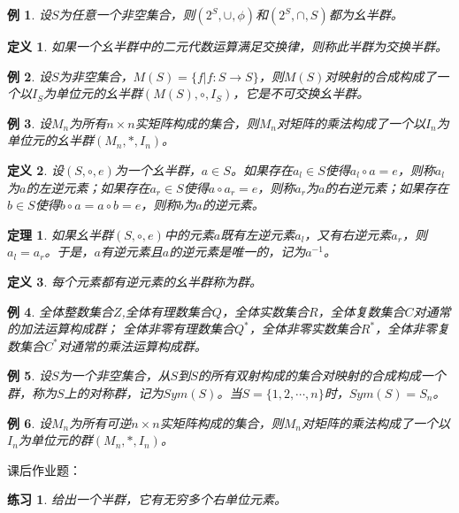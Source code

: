 \documentclass{article}
\newtheorem{Def}{定义}
\newtheorem{Thm}{定理}
\newtheorem{Exercise}{练习}
\newtheorem*{Example}{例}
\begin{document}
\begin{CJK*}{UTF8}{gbsn}
\begin{Example}
  设$S$为任意一个非空集合，则$(2^S,\cup,\phi)$和$(2^S,\cap,S)$都为幺半群。
\end{Example}

\begin{Def}
  如果一个幺半群中的二元代数运算满足交换律，则称此半群为交换半群。
\end{Def}

\begin{Example}
  设$S$为非空集合，$M(S)=\{f|f:S\to S\}$，则$M(S)$对映射的合成构成了一个以$I_S$为单位元的幺半群$(M(S),\circ,I_S)$，它是不可交换幺半群。
\end{Example}
\begin{Example}
  设$M_n$为所有$n\times n$实矩阵构成的集合，则$M_n$对矩阵的乘法构成了一个以$I_n$为单位元的幺半群$(M_n,*,I_n)$。
\end{Example}


\begin{Def}
  设$(S,\circ,e)$为一个幺半群，$a\in S$。如果存在$a_l\in S$使得$a_l\circ a=e$，则称$a_l$为$a$的左逆元素；如果存在$a_r
  \in S$使得$a\circ a_r=e$，则称$a_r$为$a$的右逆元素；如果存在$b\in S$使得$b\circ a=a\circ b=e$，则称$b$为$a$的逆元素。
\end{Def}
\begin{Thm}
  如果幺半群$(S,\circ,e)$中的元素$a$既有左逆元素$a_l$，又有右逆元素$a_r$，则$a_l=a_r$。于是，$a$有逆元素且$a$的逆元素是唯一的，记为$a^{-1}$。
\end{Thm}
\begin{Def}
  每个元素都有逆元素的幺半群称为群。
\end{Def}
\begin{Example}
  全体整数集合$Z$,全体有理数集合$Q$，全体实数集合$R$，全体复数集合$C$对通常的加法运算构成群；
  全体非零有理数集合$Q^*$，全体非零实数集合$R^*$，全体非零复数集合$C^*$对通常的乘法运算构成群。
\end{Example}
\begin{Example}
设$S$为一个非空集合，从$S$到$S$的所有双射构成的集合对映射的合成构成一个群，称为$S$上的对称群，记为$Sym(S)$。当$S=\{1,2,\cdots,n\}$时，$Sym(S)=S_n$。
\end{Example}
  \begin{Example}
    设$M_n$为所有可逆$n\times n$实矩阵构成的集合，则$M_n$对矩阵的乘法构成了一个以$I_n$为单位元的群$(M_n,*,I_n)$。
  \end{Example}

  课后作业题：

\begin{Exercise}
  给出一个半群，它有无穷多个右单位元素。
\end{Exercise}


\end{CJK*}
\end{document}

